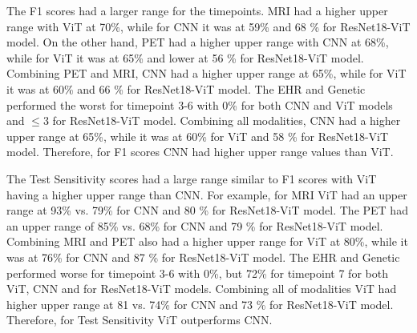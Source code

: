The F1 scores had a larger range for the timepoints. MRI had a higher upper range with ViT at 70\%, while for CNN it was at 59\% and 68 \% for ResNet18-ViT model. On the other hand, PET had a higher upper range with CNN at 68\%, while for ViT it was at 65\% and lower at 56 \% for ResNet18-ViT model. Combining PET and MRI, CNN had a higher upper range at 65\%, while for ViT it was at 60\% and 66 \% for ResNet18-ViT model. The EHR and Genetic performed the worst for timepoint 3-6 with 0\% for both CNN and ViT models and $\leq3$ for ResNet18-ViT model.  Combining all modalities, CNN had a higher upper range at 65\%, while it was at 60\% for ViT and 58 \% for ResNet18-ViT model. Therefore, for F1 scores CNN had higher upper range values than ViT. 

The Test Sensitivity scores had a large range similar to F1 scores with ViT having a higher upper range than CNN. For example, for MRI ViT had an upper range at 93\% vs. 79\% for CNN and 80 \% for ResNet18-ViT model. The PET had an upper range of 85\% vs. 68\% for CNN and 79 \% for ResNet18-ViT model. Combining MRI and PET also had a higher upper range for ViT at 80\%, while it was at 76\% for CNN and 87 \% for ResNet18-ViT model. The EHR and Genetic performed worse for timepoint 3-6 with 0\%, but 72\% for timepoint 7 for both ViT, CNN and for ResNet18-ViT models. Combining all of modalities ViT had higher upper range at 81 vs. 74\% for CNN and 73 \% for ResNet18-ViT model. Therefore, for Test Sensitivity ViT outperforms CNN.